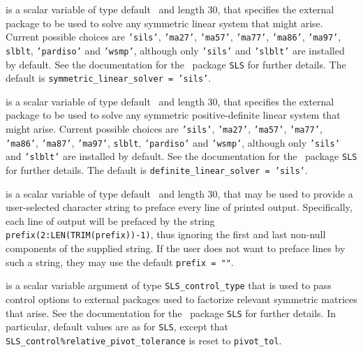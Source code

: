 \begin{description}
 is a scalar variable of type default \character\
and length 30, that specifies the external package to be used to
solve any symmetric linear system that might arise. Current possible
choices are {\tt 'sils'}, {\tt 'ma27'}, {\tt 'ma57'}, {\tt 'ma77'},
{\tt 'ma86'}, {\tt 'ma97'}, {\tt slblt}, {\tt 'pardiso'}
and {\tt 'wsmp'},
although only {\tt 'sils'} and {\tt 'slblt'} are installed by default.
See the documentation for the \galahad\ package {\tt SLS} for further details.
The default is {\tt symmetric\_linear\_solver = 'sils'}.

 is a scalar variable of type default \character\
and length 30, that specifies the external package to be used to
solve any symmetric positive-definite linear system that might arise.
Current possible
choices are {\tt 'sils'}, {\tt 'ma27'}, {\tt 'ma57'}, {\tt 'ma77'},
{\tt 'ma86'}, {\tt 'ma87'}, {\tt 'ma97'}, {\tt slblt}, {\tt 'pardiso'}
and {\tt 'wsmp'},
although only {\tt 'sils'} and {\tt 'slblt'} are installed by default.
See the documentation for the \galahad\ package {\tt SLS} for further details.
The default is {\tt definite\_linear\_solver = 'sils'}.

 is a scalar variable of type default \character\
and length 30, that may be used to provide a user-selected
character string to preface every line of printed output.
Specifically, each line of output will be prefaced by the string
{\tt prefix(2:LEN(TRIM(prefix))-1)},
thus ignoring the first and last non-null components of the
supplied string. If the user does not want to preface lines by such
a string, they may use the default {\tt prefix = ""}.

\itt{SLS\_control} is a scalar variable argument of type
{\tt SLS\_control\_type} that is used to pass control
options to external packages used to
factorize relevant symmetric matrices that arise.
See the documentation for the \galahad\ package {\tt SLS} for further details.
In particular, default values are as for {\tt SLS}, except that
{\tt SLS\_control\%rela\-tive\_pivot\_tolerance} is reset to
{\tt pivot\_tol}.

\end{description}
